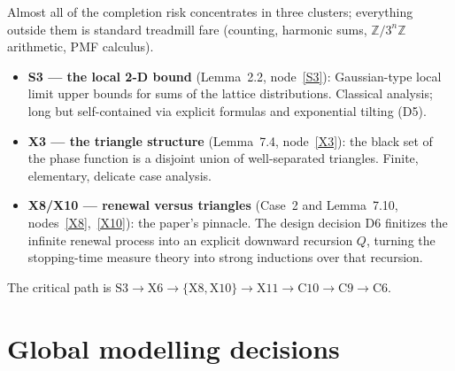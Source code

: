Almost all of the completion risk concentrates in three clusters; everything outside them is
standard treadmill fare (counting, harmonic sums, \(\mathbb{Z}/3^n\mathbb{Z}\) arithmetic,
PMF calculus).
\begin{itemize}
  \item \textbf{S3 --- the local 2-D bound} (Lemma~2.2, node~\ref{S3}): Gaussian-type local
        limit upper bounds for sums of the lattice distributions.  Classical analysis;
        long but self-contained via explicit formulas and exponential tilting (D5).
  \item \textbf{X3 --- the triangle structure} (Lemma~7.4, node~\ref{X3}): the black set of
        the phase function is a disjoint union of well-separated triangles.  Finite,
        elementary, delicate case analysis.
  \item \textbf{X8/X10 --- renewal versus triangles} (Case~2 and Lemma~7.10,
        nodes~\ref{X8},~\ref{X10}): the paper's pinnacle.  The design decision D6 finitizes
        the infinite renewal process into an explicit downward recursion \(Q\), turning the
        stopping-time measure theory into strong inductions over that recursion.
\end{itemize}
The critical path is
\(\text{S3}\to\text{X6}\to\{\text{X8},\text{X10}\}\to\text{X11}\to\text{C10}\to\text{C9}
  \to\text{C6}\).

\section{Global modelling decisions}

